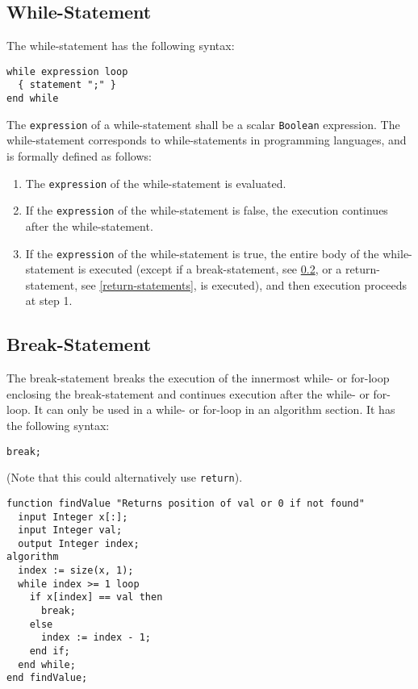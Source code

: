 \subsection{While-Statement}\label{while-statement}

The while-statement has the following syntax:
\begin{lstlisting}[language=grammar]
while expression loop
  { statement ";" }
end while
\end{lstlisting}
The \lstinline!expression! of a while-statement shall be a scalar \lstinline!Boolean! expression.  The while-statement corresponds to while-statements in programming languages, and is formally defined as follows:
\begin{enumerate}
\item The \lstinline!expression! of the while-statement is evaluated.
\item If the \lstinline!expression! of the while-statement is false, the execution
continues after the while-statement.
\item If the \lstinline!expression! of the while-statement is true, the entire body of
the while-statement is executed (except if a break-statement, see
\cref{break-statement}, or a return-statement, see \cref{return-statements}, is executed),
and then execution proceeds at step 1.
\end{enumerate}

\subsection{Break-Statement}\label{break-statement}

The break-statement breaks the execution of the innermost while- or for-loop enclosing the break-statement and continues execution after the while- or for-loop.  It can only be used in a while- or for-loop in an algorithm section.  It has the following syntax:
\begin{lstlisting}[language=modelica]
break;
\end{lstlisting}

\begin{example}
(Note that this could alternatively use \lstinline!return!).
\begin{lstlisting}[language=modelica]
function findValue "Returns position of val or 0 if not found"
  input Integer x[:];
  input Integer val;
  output Integer index;
algorithm
  index := size(x, 1);
  while index >= 1 loop
    if x[index] == val then
      break;
    else
      index := index - 1;
    end if;
  end while;
end findValue;
\end{lstlisting}
\end{example}

